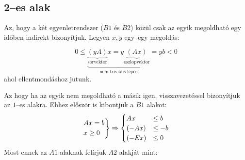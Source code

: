 \subsection{2--es alak}

Az, hogy a két egyenletrendszer ($B1$ és $B2$) közül csak az egyik megoldható
egy időben indirekt bizonyítjuk. Legyen $x,y$ egy--egy megoldás:

\[ 0 \leq \underbrace{
	\underbrace{(yA)}_{\mbox{sorvektor}}x =
	y\underbrace{(Ax)}_{\mbox{oszlopvektor}}}
	_{\mbox{nem triviális lépés}}=yb<0\] ahol ellentmondáshoz jutunk.

Az hogy ha az egyik nem megoldható a másik igen, visszavezetéssel bizonyítjuk az
$1$--es alakra. Ehhez először is kibontjuk a $B1$ alakot:
\[
	\begin{rcases}
		Ax =b \\
		x \geq 0
	\end{rcases} \Rightarrow
	\begin{cases}
		A x    & \leq b  \\
		(-A x) & \leq -b \\
		(-E x) & \leq 0
	\end{cases}
\]
Most ennek az $A1$ alaknak felírjuk $A2$ alakját mint:

